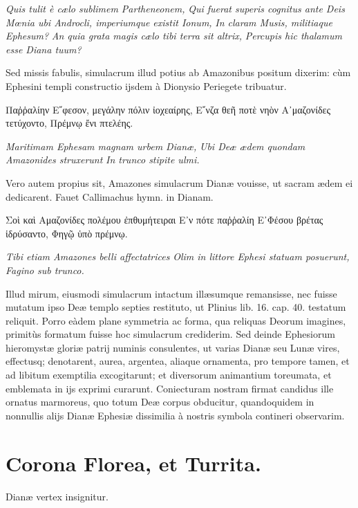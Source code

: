 \documentclass[a4paper, 11pt, oneside, polutonikogreek, latin]{article}
\begin{document}
\emph{Quis tulit è cælo sublimem Partheneonem,}
\emph{Qui fuerat superis cognitus ante Deis}
\emph{Mœnia ubi Androcli, imperiumque existit Ionum,}
\emph{In claram Musis, militiaque Ephesum?}
\emph{An quia grata magis cælo tibi terra sit altrix,}
\emph{Percupis hic thalamum esse Diana tuum?}

Sed missis fabulis, simulacrum illud potius ab Amazonibus positum dixerim: cùm Ephesini templi constructio ijsdem à Dionysio Periegete tribuatur.

Παῤῥαλίην Ε῎φεσον, μεγάλην πόλιν ἰοχεαίρης,
Ε῎νζα θεῆ ποτὲ νηὸν Α᾽μαζονίδες τετύχοντο,
Πρέμνῳ ἔνι πτελέης.

\emph{Maritimam Ephesam magnam urbem Dianæ,}
\emph{Ubi Deæ ædem quondam Amazonides struxerunt}
\emph{In trunco stipite ulmi.}

Vero autem propius sit, Amazones simulacrum Dianæ vouisse, ut sacram ædem ei dedicarent. Fauet Callimachus hymn. in Dianam.

Σοὶ καὶ Αμαζονίδες πολέμου ἐπθυμήτειραι
Ε᾽ν πότε παῤῥαλίη Ε᾽Φέσου βρέτας ἱδρύσαντο,
Φηγῷ ὑπὸ πρέμνῳ.

\emph{Tibi etiam Amazones belli affectatrices}
\emph{Olim in littore Ephesi statuam posuerunt,}
\emph{Fagino sub trunco.}

Illud mirum, eiusmodi simulacrum intactum illæsumque remansisse, nec fuisse mutatum ipso Deæ templo septies restituto, ut Plinius lib. 16. cap. 40. testatum reliquit. Porro eàdem plane symmetria ac forma, qua reliquas Deorum imagines, primitùs formatum fuisse hoc simulacrum crediderim. Sed deinde Ephesiorum hieromystæ gloriæ patrij numinis consulentes, ut varias Dianæ seu Lunæ vires, effectusq; denotarent, aurea, argentea, aliaque ornamenta, pro tempore tamen, et ad libitum exemptilia excogitarunt; et diversorum animantium toreumata, et emblemata in ijs exprimi curarunt. Coniecturam nostram firmat candidus ille ornatus marmoreus, quo totum Deæ corpus obducitur, quandoquidem in nonnullis alijs Dianæ Ephesiæ dissimilia à nostris symbola contineri observarim.
\clearpage
\section{Corona Florea, et Turrita.}

Dianæ vertex insignitur.
\end{document}
